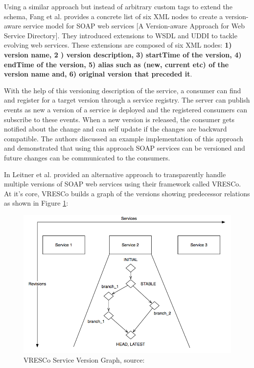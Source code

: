 \documentclass[runningheads,a4paper]{llncs}
\begin{document}
Using a similar approach but instead of arbitrary custom tags to extend the schema, Fang et al. provides a concrete list of six XML nodes to create a version-aware service model for SOAP web services [A Version-aware Approach for Web Service Directory]. They introduced extensions to WSDL and UDDI to tackle evolving web services. These extensions are composed of six XML nodes: \textbf{1) version name, 2 ) version description, 3) startTime of the version, 4) endTime of the version, 5) alias such as (new, current etc) of the version name and, 6) original version that preceded it}.

With the help of this versioning description of the service, a consumer can find and register for a target version through a service registry. The server can publish events as new a version of a service is deployed and the registered consumers can subscribe to these events. When a new version is released, the consumer gets notified about the change and can self update if the changes are backward compatible. The authors discussed an example implementation of this approach and demonstrated that using this approach SOAP services can be versioned and future changes can be communicated to the consumers.

In \cite{leitner2008end} Leitner et al. provided an alternative approach to transparently handle multiple versions of SOAP web services using their framework called VRESCo. At it’s core, VRESCo builds a graph of the versions showing predecessor relations as shown in Figure \ref{fig:vresco}:

\begin{figure}[ht]
  \centering
  \includegraphics[width=\textwidth]{vresco.png}
    \caption{VRESCo Service Version Graph, source: \cite{leitner2008end}}
  \label{fig:vresco}
\end{figure}
\end{document}
